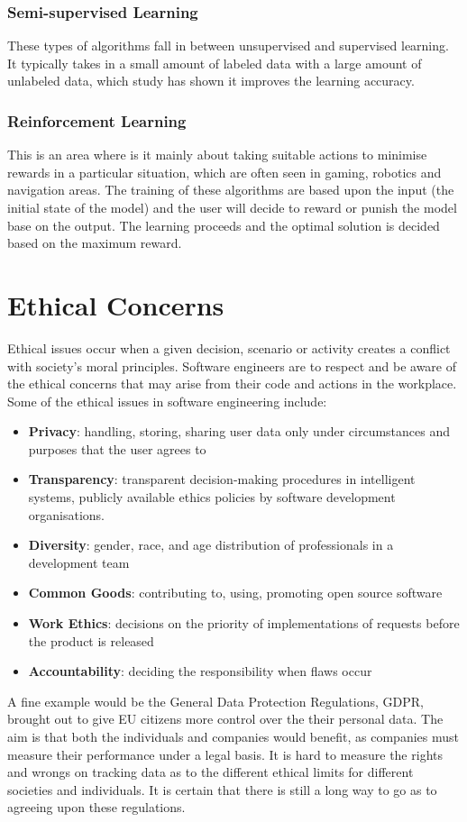 \documentclass[a4paper]{article}
\begin{document}
{\subsubsection{Semi-supervised Learning}
These types of algorithms fall in between unsupervised and supervised learning. It typically takes in a small amount of labeled data with a large amount of unlabeled data, which study has shown it improves the learning accuracy.
\subsubsection{Reinforcement Learning}
This is an area where is it mainly about taking suitable actions to minimise rewards in a particular situation, which are often seen in gaming, robotics and navigation areas. The training of these algorithms are based upon the input (the initial state of the model) and the user will decide to reward or punish the model base on the output. The learning proceeds and the optimal solution is decided based on the maximum reward.\autocite{R12}

\section{Ethical Concerns}
Ethical issues occur when a given decision, scenario or activity creates a conflict with society's moral principles. Software engineers are to respect and be aware of the ethical concerns that may arise from their code and actions in the workplace. 
Some of the ethical issues in software engineering include:
\begin{itemize}
    \item \textbf{Privacy}: handling, storing, sharing user data only under circumstances and purposes that the user agrees to
    \item \textbf{Transparency}: transparent decision-making procedures in intelligent systems, publicly available ethics policies by software development organisations.
    \item \textbf{Diversity}: gender, race, and age distribution of professionals in a development team
    \item \textbf{Common Goods}: contributing to, using, promoting open source software
    \item \textbf{Work Ethics}: decisions on the priority of implementations of requests before the product is released
    \item \textbf{Accountability}: deciding the responsibility when flaws occur\autocite{R13}
\end{itemize}
\bigbreak
A fine example would be the General Data Protection Regulations, GDPR, brought out to give EU citizens more control over the their personal data. The aim is that both the individuals and companies would benefit, as companies must measure their performance under a legal basis.\autocite{R14}
\bigbreak 
It is hard to measure the rights and wrongs on tracking data as to the different ethical limits for different societies and individuals. It is certain that there is still a long way to go as to agreeing upon these regulations.
\bigbreak
}
\end{document}
